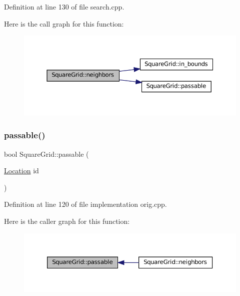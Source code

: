 Definition at line 130 of file search.\+cpp.

Here is the call graph for this function\+:
\nopagebreak
\begin{figure}[H]
\begin{center}
\leavevmode
\includegraphics[width=350pt]{struct_square_grid_a106d76702d8c4acb03883c477db28e3a_cgraph}
\end{center}
\end{figure}
\mbox{\label{struct_square_grid_a3f638b46510dd880823b1acac75c7b96}} 
\subsubsection{\texorpdfstring{passable()}{passable()}\hspace{0.1cm}{\footnotesize\ttfamily [1/2]}}
{\footnotesize\ttfamily bool Square\+Grid\+::passable (\begin{DoxyParamCaption}\item[{\mbox{\hyperlink{struct_square_grid_a2c9a2cbd3912aa48ac97289abc3f1c0f}{Location}}}]{id }\end{DoxyParamCaption})\hspace{0.3cm}{\ttfamily [inline]}}



Definition at line 120 of file implementation orig.\+cpp.

Here is the caller graph for this function\+:\nopagebreak
\begin{figure}[H]
\begin{center}
\leavevmode
\includegraphics[width=350pt]{struct_square_grid_a3f638b46510dd880823b1acac75c7b96_icgraph}
\end{center}
\end{figure}
\mbox{\label{struct_square_grid_a3f638b46510dd880823b1acac75c7b96}} 
